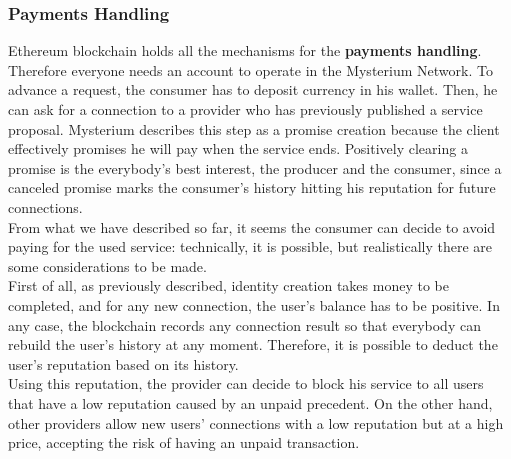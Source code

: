 \documentclass[12pt]{article}
\begin{document}
	\subsubsection{Payments Handling}
	Ethereum blockchain holds all the mechanisms for the \textbf{payments handling}. Therefore everyone needs an account to operate in the Mysterium Network. To advance a request, the consumer has to deposit currency in his wallet. Then, he can ask for a connection to a provider who has previously published a service proposal. Mysterium describes this step as a promise creation because the client effectively promises he will pay when the service ends. Positively clearing a promise is the everybody's best interest, the producer and the consumer, since a canceled promise marks the consumer's history hitting his reputation for future connections.\\
	From what we have described so far, it seems the consumer can decide to avoid paying for the used service: technically, it is possible, but realistically there are some considerations to be made.\\
	First of all, as previously described, identity creation takes money to be completed, and for any new connection, the user's balance has to be positive. In any case, the blockchain records any connection result so that everybody can rebuild the user's history at any moment. Therefore, it is possible to deduct the user's reputation based on its history.\\
	Using this reputation, the provider can decide to block his service to all users that have a low reputation caused by an unpaid precedent. On the other hand, other providers allow new users' connections with a low reputation but at a high price, accepting the risk of having an unpaid transaction.\\
	
\end{document}
